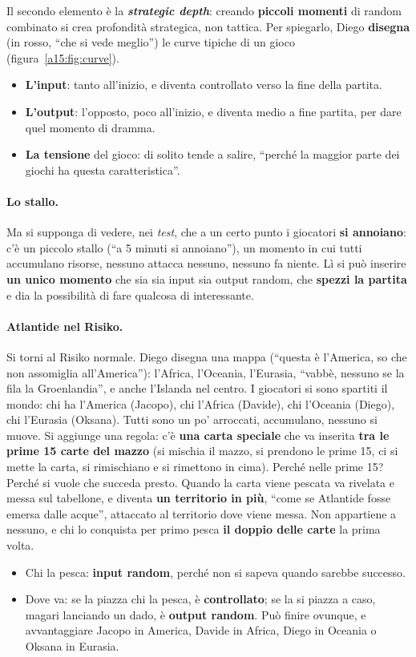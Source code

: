 Il secondo elemento è la \textbf{\emph{strategic depth}}: creando \textbf{piccoli momenti} di
random combinato si crea profondità strategica, non tattica. Per spiegarlo, Diego
\textbf{disegna} (in rosso, ``che si vede meglio'') le curve tipiche di un gioco
(figura~\ref{a15:fig:curve}).
\begin{itemize}
  \item \textbf{L'input}: tanto all'inizio, e diventa controllato verso la fine della partita.
  \item \textbf{L'output}: l'opposto, poco all'inizio, e diventa medio a fine partita, per
        dare quel momento di dramma.
  \item \textbf{La tensione} del gioco: di solito tende a salire, ``perché la maggior parte dei
        giochi ha questa caratteristica''.
\end{itemize}

\paragraph{Lo stallo.} Ma si supponga di vedere, nei \emph{test}, che a un certo punto i
giocatori \textbf{si annoiano}: c'è un piccolo stallo (``a 5 minuti si annoiano''), un momento
in cui tutti accumulano risorse, nessuno attacca nessuno, nessuno fa niente. Lì si può
inserire \textbf{un unico momento} che sia sia input sia output random, che \textbf{spezzi la
partita} e dia la possibilità di fare qualcosa di interessante.

\paragraph{Atlantide nel Risiko.} Si torni al Risiko normale. Diego disegna una mappa
(``questa è l'America, so che non assomiglia all'America''): l'Africa, l'Oceania, l'Eurasia,
``vabbè, nessuno se la fila la Groenlandia'', e anche l'Islanda nel centro. I giocatori si sono
spartiti il mondo: chi ha l'America (Jacopo), chi l'Africa (Davide), chi l'Oceania (Diego),
chi l'Eurasia (Oksana). Tutti sono un po' arroccati, accumulano, nessuno si muove. Si aggiunge
una regola: c'è \textbf{una carta speciale} che va inserita \textbf{tra le prime 15 carte del
mazzo} (si mischia il mazzo, si prendono le prime 15, ci si mette la carta, si rimischiano e
si rimettono in cima). Perché nelle prime 15? Perché si vuole che succeda presto. Quando la
carta viene pescata va rivelata e messa sul tabellone, e diventa \textbf{un territorio in
più}, ``come se Atlantide fosse emersa dalle acque'', attaccato al territorio dove viene
messa. Non appartiene a nessuno, e chi lo conquista per primo pesca \textbf{il doppio delle
carte} la prima volta.
\begin{itemize}
  \item Chi la pesca: \textbf{input random}, perché non si sapeva quando sarebbe successo.
  \item Dove va: se la piazza chi la pesca, è \textbf{controllato}; se la si piazza a caso,
        magari lanciando un dado, è \textbf{output random}. Può finire ovunque, e avvantaggiare
        Jacopo in America, Davide in Africa, Diego in Oceania o Oksana in Eurasia.
\end{itemize}

